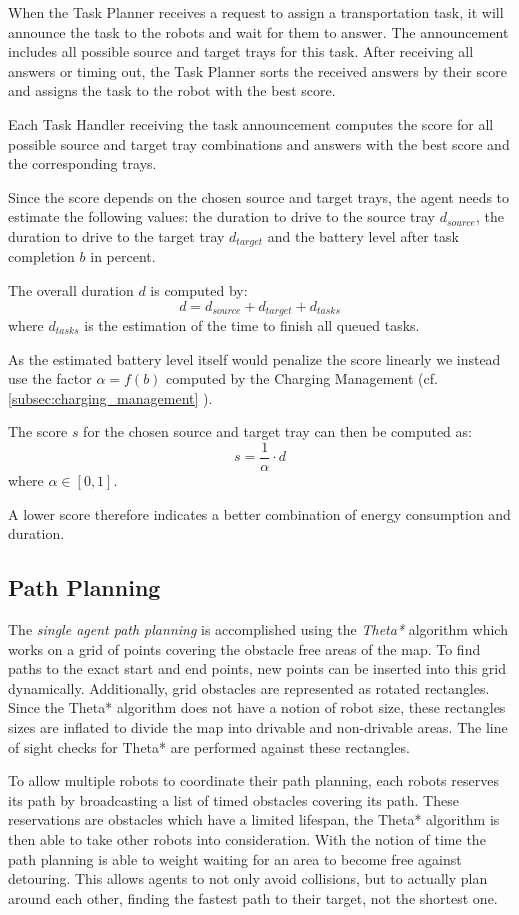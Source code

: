 \documentclass[journal]{IEEEtran}
\newcommand{\compref}[1]{\autoref{#1} \nameref{#1}}
\begin{document}
When the Task Planner receives a request to assign a transportation task, it will announce the task to the robots and wait for them to answer.
The announcement includes all possible source and target trays for this task.
After receiving all answers or timing out, the Task Planner sorts the received answers by their score and assigns the task to the robot with the best score.

Each Task Handler receiving the task announcement computes the score for all possible source and target tray combinations and answers with the best score and the corresponding trays.

Since the score depends on the chosen source and target trays, the agent needs to estimate the following values: the duration to drive to the source tray $d_{source}$, the duration to drive to the target tray $d_{target}$ and the battery level after task completion $b$ in percent.

The overall duration $d$ is computed by:
$$d = d_{source} + d_{target} + d_{tasks}$$
where $d_{tasks}$ is the estimation of the time to finish all queued tasks.

As the estimated battery level itself would penalize the score linearly we instead use the factor $\alpha = f(b)$ computed by the Charging Management (cf. \compref{subsec:charging_management}).

The score $s$ for the chosen source and target tray can then be computed as:
$$ s = \frac{1}{\alpha} \cdot d$$
where $\alpha \in [0, 1]$.

A lower score therefore indicates a better combination of energy consumption and duration.


\subsection{Path Planning}
\label{subsec:path_planning}
The \emph{single agent path planning} is accomplished using the \emph{Theta*} algorithm which works on a grid of points covering the obstacle free areas of the map. To find paths to the exact start and end points, new points can be inserted into this grid dynamically. Additionally, grid obstacles are represented as rotated rectangles. Since the Theta* algorithm does not have a notion of robot size, these rectangles sizes are inflated to divide the map into drivable and non-drivable areas. The line of sight checks for Theta* are performed against these rectangles.

To allow multiple robots to coordinate their path planning, each robots reserves its path by broadcasting a list of timed obstacles covering its path. These reservations are obstacles which have a limited lifespan, the Theta* algorithm is then able to take other robots into consideration. With the notion of time the path planning is able to weight waiting for an area to become free against detouring. This allows agents to not only avoid collisions, but to actually plan around each other, finding the fastest path to their target, not the shortest one.
\end{document}
